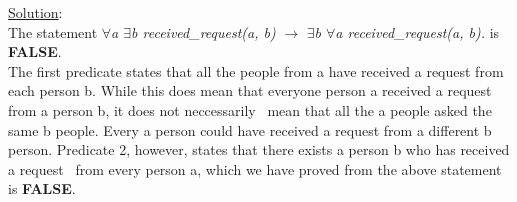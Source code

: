 \begin{enumerate}
    \noindent \underline{Solution}:\\ The statement \emph{$\forall$a $\exists$b received\_request(a, b)} $\rightarrow$ \emph{$\exists$b $\forall$a received\_request(a, b).} is \textbf{FALSE}.\\
    The first predicate states that all the people from a have received a request from each person b. While this does mean that everyone person a received a request from a person b, it does not neccessarily \
    mean that all the a people asked the same b people. Every a person could have received a request from a different b person. Predicate 2, however, states that there exists a person b who has received a request \
    from every person a, which we have proved from the above statement is \textbf{FALSE}.



    

    
  \end{enumerate}   
 